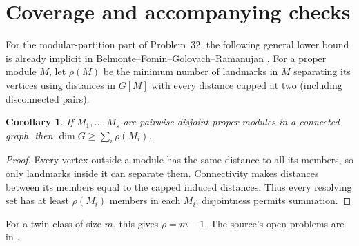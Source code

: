 \documentclass[11pt]{article}
\newtheorem{corollary}[theorem]{Corollary}
\begin{document}
\section{Coverage and accompanying checks}
For the modular-partition part of Problem~32, the following general
lower bound is already implicit in Belmonte--Fomin--Golovach--Ramanujan
\cite[Section~4, Lemma~7, p.~16]{BFG}.
For a proper module $M$, let $\rho(M)$ be the minimum number of
landmarks in $M$ separating its vertices using distances in $G[M]$
with every distance capped at two (including disconnected pairs).
\begin{corollary}\label{cor:module}
If $M_1,\ldots,M_s$ are pairwise disjoint proper modules in a connected
graph, then $\dim G\geq\sum_i\rho(M_i)$.
\end{corollary}
\begin{proof}
Every vertex outside a module has the same distance to all its members,
so only landmarks inside it can separate them. Connectivity makes
distances between its members equal to the capped induced distances.
Thus every resolving set has at least $\rho(M_i)$ members in each $M_i$;
disjointness permits summation.
\end{proof}
For a twin class of size $m$, this gives $\rho=m-1$.
The source's open problems are in \cite[Section~9, p.~27]{AKS}.
\end{document}
